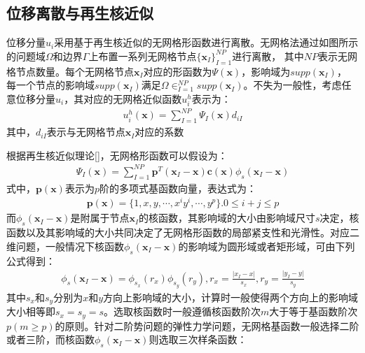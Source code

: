 \subsection{位移离散与再生核近似}
位移分量$u_i$采用基于再生核近似的无网格形函数进行离散。无网格法通过如图所示的问题域$\Omega$和边界$\Gamma$上布置一系列无网格节点$\{\pmb{x}_I\}^{N\!P}_{I=1}$进行离散，
其中$N\!P$表示无网格节点数量。每个无网格节点$\pmb{x}_I$对应的形函数为$\Psi(\pmb{x})$，影响域为$supp(\pmb{x}_I)$，
每一个节点的影响域$supp(\pmb{x}_I)$满足$\Omega\in^{N\!P}_{I=1}supp(\pmb{x}_I)$。不失为一般性，考虑任意位移分量$u_i$，其对应的无网格近似函数$u^h_i$表示为：
\begin{equation}
\begin{split}
    u^h_i(\pmb{x})=\sum_{I=1}^{N\!P}\Psi_I(\pmb{x})d_{iI}
\end{split}
\end{equation}
其中，$d_{iI}$表示与无网格节点$\pmb{x}_I$对应的系数\par
根据再生核近似理论[]，无网格形函数可以假设为：
\begin{equation}\label{shapefunction}
\begin{split}
    \Psi_I(\pmb{x})=\sum_{I=1}^{N\!P}\pmb{p}^T(\pmb{x}_I-\pmb{x})\pmb{c}(\pmb{x})\phi_s(\pmb{x}_I-\pmb{x})
\end{split}
\end{equation}
式中，$\pmb{p}(\pmb{x})$表示为$p$阶的多项式基函数向量，表达式为：
\begin{equation}
\begin{split}
    \pmb{p}(\pmb{x})=\{1,x,y,\dotsb,x^iy^i,\dotsb,y^p\}.0\le i+j \le p
\end{split}
\end{equation}
而$\phi_s(\pmb{x}_I-\pmb{x})$是附属于节点$\pmb{x}_I$的核函数，其影响域的大小由影响域尺寸$s$决定，核函数以及其影响域的大小共同决定了无网格形函数的局部紧支性和光滑性。对应二维问题，一般情况下核函数$\phi_s(\pmb{x}_I-\pmb{x})$的影响域为圆形域或者矩形域，可由下列公式得到：
\begin{equation}
\begin{split}
    \phi_s(\pmb{x}_I-\pmb{x})=\phi_{s_x}(r_x)\phi_{s_y}(r_y),r_x=\frac{\lvert x_I-x\rvert}{s_x},r_y=\frac{\lvert y_I-y \rvert}{s_y}
\end{split}
\end{equation}
其中$s_x$和$s_y$分别为$x$和$y$方向上影响域的大小，计算时一般使得两个方向上的影响域大小相等即$s_x=s_y=s$。选取核函数时一般遵循核函数阶次$m$大于等于基函数阶次$p(m\ge p)$的原则。针对二阶势问题的弹性力学问题，无网格基函数一般选择二阶或者三阶，而核函数$\phi_s(\pmb{x}_I-\pmb{x})$则选取三次样条函数：
